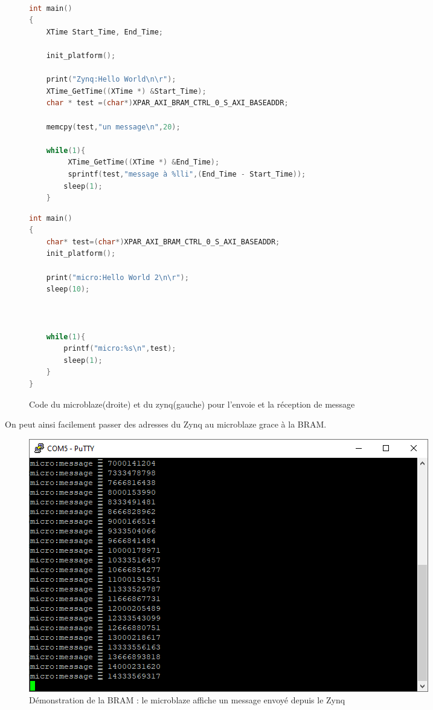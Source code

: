 \documentclass[12pt,a4paper]{article}
\begin{document}
\begin{figure}[H]
\begin{multicols}{2}
		\begin{lstlisting}[language=C]
		
int main()
{
	XTime Start_Time, End_Time;

    init_platform();

    print("Zynq:Hello World\n\r");
    XTime_GetTime((XTime *) &Start_Time);
    char * test =(char*)XPAR_AXI_BRAM_CTRL_0_S_AXI_BASEADDR;

    memcpy(test,"un message\n",20);

    while(1){
    	 XTime_GetTime((XTime *) &End_Time);
    	 sprintf(test,"message à %lli",(End_Time - Start_Time));
    	sleep(1);
    }
	\end{lstlisting}	
	 \bigskip
			\begin{lstlisting}[language=C]
int main()
{
	char* test=(char*)XPAR_AXI_BRAM_CTRL_0_S_AXI_BASEADDR;
    init_platform();

    print("micro:Hello World 2\n\r");
	sleep(10);
    
    
    
    while(1){
    	printf("micro:%s\n",test);
    	sleep(1);
    }
}

	\end{lstlisting}	
\end{multicols}		
	\caption{Code du microblaze(droite) et du zynq(gauche) pour l'envoie et la réception de message}
	\label{fig-hls}
\end{figure}
On peut ainsi facilement passer des adresses du Zynq au microblaze grace à la BRAM.
\begin{figure}[H]
	\centering
		\includegraphics[width=\linewidth]{im/bram2.png}	
	\caption{Démonstration de la BRAM : le microblaze affiche un message envoyé depuis le Zynq}
	\label{fig-bram2}
\end{figure}
\end{document}
